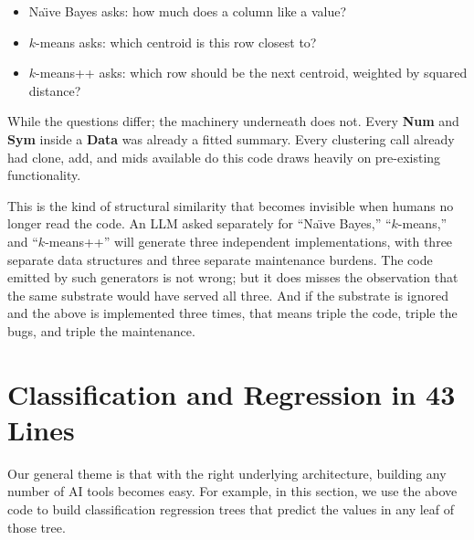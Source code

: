 \documentclass[AMA,STIX2COL]{WileyNJDv5}
\newcommand{\cls}[1]{%
  \setlength{\fboxsep}{1.5pt}%
  \colorbox{clsbg}{\sffamily\bfseries{#1}}%
}
\begin{document}
\begin{itemize}
\item Na\"{\i}ve Bayes asks: how much does a column like a value?
\item $k$-means asks: which centroid is this row closest to?
\item $k$-means++ asks: which row should be the next centroid,
weighted by squared distance?
\end{itemize}
While the questions differ; the machinery underneath does not. Every
\cls{Num} and \cls{Sym} inside a \cls{Data} was already a fitted
summary. Every clustering call already had \textsf{clone},
\textsf{add}, and \textsf{mids} available do this code draws heavily on
pre-existing functionality.

This is the kind of structural similarity that becomes invisible
when humans no longer read the code. An LLM asked separately for
``Na\"{\i}ve Bayes,'' ``$k$-means,'' and ``$k$-means++'' will
generate three independent implementations, with three separate
data structures and three separate maintenance burdens. The
code emitted by such generators is not wrong;
but it does  misses the observation that the same substrate would
have served all three. And if the substrate is ignored and the above
is implemented three times, that  means
triple the code, triple the bugs,  and triple the maintenance. 


  \section{ Classification and Regression in 43 Lines}\label{trees}

 

 Our general theme is that with the right underlying
 architecture, building any number of AI tools becomes
 easy.
For example, in this section, we use the above code to build
classification 
 regression trees that predict the   values in any leaf of those tree.
 
\end{document}
